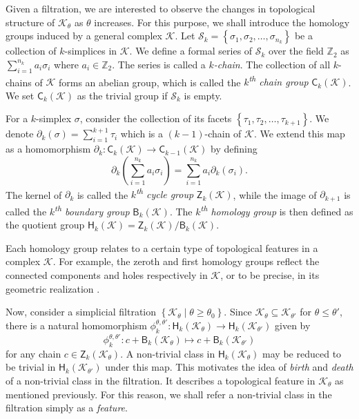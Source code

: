 \documentclass[sn-mathphys-num]{sn-jnl}%
\theoremstyle{thmstyleone}%
\theoremstyle{thmstyletwo}%
\theoremstyle{thmstylethree}%
\begin{document}
Given a filtration, we are interested to observe the changes in topological structure of $\mathcal{K}_\theta$ as $\theta$ increases. For this purpose, we shall introduce the homology groups induced by a general complex $\mathcal{K}$. Let $\mathcal{S}_k=\left\{\sigma_1, \sigma_2, \ldots, \sigma_{n_k}\right\}$ be a collection of $k$-simplices in $\mathcal{K}$. We define a formal series of $\mathcal{S}_k$ over the field $\mathbb{Z}_2$ as $\sum_{i=1}^{n_k} a_i \sigma_i$ where $a_i \in \mathbb{Z}_2$. The series is called a \emph{$k$-chain}. The collection of all $k$-chains of $\mathcal{K}$ forms an abelian group, which is called the \emph{$k$\textsuperscript{th} chain group} $\mathsf{C}_k(\mathcal{K})$. We set $\mathsf{C}_k(\mathcal{K})$ as the trivial group if $\mathcal{S}_k$ is empty.

For a $k$-simplex $\sigma$, consider the collection of its facets $\left\{\tau_1, \tau_2, \ldots, \tau_{k+1}\right\}$. We denote $\partial_k(\sigma)=\sum_{i=1}^{k+1} \tau_i$ which is a $(k-1)$-chain of $\mathcal{K}$. We extend this map as a homomorphism $\partial_k: \mathsf{C}_k(\mathcal{K}) \rightarrow \mathsf{C}_{k-1}(\mathcal{K})$ by defining
\begin{equation*}
	\partial_k\left(\sum_{i=1}^{n_k} a_i \sigma_i\right)=\sum_{i=1}^{n_k} a_i \partial_k\left(\sigma_i\right).
\end{equation*}
The kernel of $\partial_k$ is called the \emph{$k$\textsuperscript{th} cycle group} $\mathsf{Z}_k(\mathcal{K})$, while the image of $\partial_{k+1}$ is called the \emph{$k$\textsuperscript{th} boundary group} $\mathsf{B}_k(\mathcal{K})$. The \emph{$k$\textsuperscript{th} homology group} is then defined as the quotient group $\mathsf{H}_k(\mathcal{K})=\mathsf{Z}_k(\mathcal{K}) / \mathsf{B}_k(\mathcal{K})$.

Each homology group relates to a certain type of topological features in a complex $\mathcal{K}$. For example, the zeroth and first homology groups reflect the connected components and holes respectively in $\mathcal{K}$, or to be precise, in its geometric realization \cite{Aktas-Akbas-Fatmaoui}.

Now, consider a simplicial filtration $\left\{\mathcal{K}_\theta \mid \theta \geq \theta_0\right\}$. Since $\mathcal{K}_\theta \subseteq \mathcal{K}_{\theta'}$ for $\theta \leq \theta'$, there is a natural homomorphism $\phi_k^{\theta, \theta'}: \mathsf{H}_k(\mathcal{K}_\theta) \rightarrow \mathsf{H}_k(\mathcal{K}_{\theta'})$ given by
\begin{equation*}
	\phi_k^{\theta, \theta'}: c+\mathsf{B}_k(\mathcal{K}_\theta) \mapsto c+\mathsf{B}_k(\mathcal{K}_{\theta'})
\end{equation*}
for any chain $c \in \mathsf{Z}_k(\mathcal{K}_\theta)$. A non-trivial class in $\mathsf{H}_k(\mathcal{K}_\theta)$ may be reduced to be trivial in $\mathsf{H}_k(\mathcal{K}_{\theta'})$ under this map. This motivates the idea of \emph{birth} and \emph{death} of a non-trivial class in the filtration. It describes a topological feature in $\mathcal{K}_\theta$ as mentioned previously. For this reason, we shall refer a non-trivial class in the filtration simply as a \emph{feature}.
\end{document}
